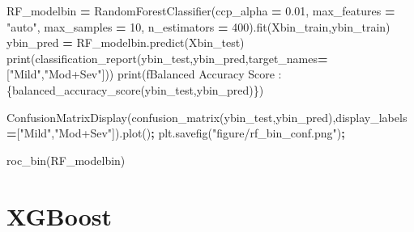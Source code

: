 \documentclass[12pt,twoside]{deuthesis}
\newenvironment{Shaded}{\begin{snugshade}}{\end{snugshade}}
\newcommand{\BuiltInTok}[1]{#1}
\newcommand{\DecValTok}[1]{\textcolor[rgb]{0.00,0.00,0.81}{#1}}
\newcommand{\FloatTok}[1]{\textcolor[rgb]{0.00,0.00,0.81}{#1}}
\newcommand{\NormalTok}[1]{#1}
\newcommand{\OperatorTok}[1]{\textcolor[rgb]{0.81,0.36,0.00}{\textbf{#1}}}
\newcommand{\SpecialCharTok}[1]{\textcolor[rgb]{0.00,0.00,0.00}{#1}}
\newcommand{\SpecialStringTok}[1]{\textcolor[rgb]{0.31,0.60,0.02}{#1}}
\newcommand{\StringTok}[1]{\textcolor[rgb]{0.31,0.60,0.02}{#1}}
\begin{document}
\begin{Shaded}
\begin{Highlighting}[]
\NormalTok{RF\_modelbin }\OperatorTok{=}\NormalTok{ RandomForestClassifier(ccp\_alpha }\OperatorTok{=} \FloatTok{0.01}\NormalTok{, }
\NormalTok{                                     max\_features }\OperatorTok{=} \StringTok{"auto"}\NormalTok{,}
\NormalTok{                                     max\_samples }\OperatorTok{=} \DecValTok{10}\NormalTok{,}
\NormalTok{                                     n\_estimators }\OperatorTok{=} \DecValTok{400}\NormalTok{).fit(Xbin\_train,ybin\_train)}
\NormalTok{ybin\_pred }\OperatorTok{=}\NormalTok{ RF\_modelbin.predict(Xbin\_test)}
\BuiltInTok{print}\NormalTok{(classification\_report(ybin\_test,ybin\_pred,target\_names}\OperatorTok{=}\NormalTok{[}\StringTok{"Mild"}\NormalTok{,}\StringTok{"Mod+Sev"}\NormalTok{]))}
\BuiltInTok{print}\NormalTok{(}\SpecialStringTok{f\textquotesingle{}Balanced Accuracy Score : }\SpecialCharTok{\{}\NormalTok{balanced\_accuracy\_score(ybin\_test,ybin\_pred)}\SpecialCharTok{\}}\SpecialStringTok{\textquotesingle{}}\NormalTok{)}
\end{Highlighting}
\end{Shaded}
\begin{Shaded}
\begin{Highlighting}[]
\NormalTok{ConfusionMatrixDisplay(confusion\_matrix(ybin\_test,ybin\_pred),display\_labels}\OperatorTok{=}\NormalTok{[}\StringTok{"Mild"}\NormalTok{,}\StringTok{"Mod+Sev"}\NormalTok{]).plot()}\OperatorTok{;}
\NormalTok{plt.savefig(}\StringTok{"figure/rf\_bin\_conf.png"}\NormalTok{)}\OperatorTok{;}
\end{Highlighting}
\end{Shaded}
\begin{Shaded}
\begin{Highlighting}[]
\NormalTok{roc\_bin(RF\_modelbin)}
\end{Highlighting}
\end{Shaded}
\hypertarget{xgboost-2}{%
\section{XGBoost}\label{xgboost-2}}
\end{document}
